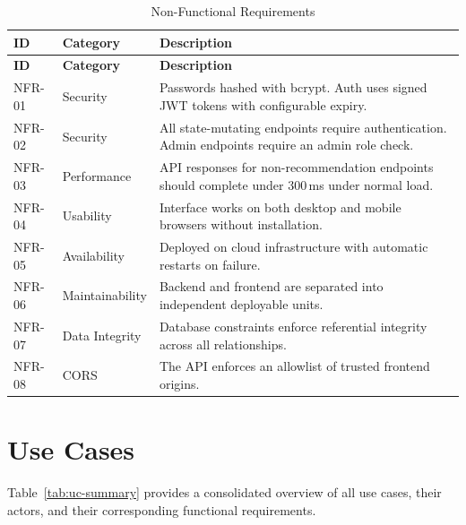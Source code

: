 \documentclass[12pt,a4paper]{report}
\begin{document}
\begin{longtable}{p{} p{} p{}}
\caption{Non-Functional Requirements}\label{tab:nonfunc-req}\\
\toprule
\textbf{ID} & \textbf{Category} & \textbf{Description} \\
\midrule
\endfirsthead
\toprule
\textbf{ID} & \textbf{Category} & \textbf{Description} \\
\midrule
\endhead
NFR-01 & Security & Passwords hashed with bcrypt. Auth uses signed JWT tokens with configurable expiry. \\
NFR-02 & Security & All state-mutating endpoints require authentication. Admin endpoints require an admin role check. \\
NFR-03 & Performance & API responses for non-recommendation endpoints should complete under 300\,ms under normal load. \\
NFR-04 & Usability & Interface works on both desktop and mobile browsers without installation. \\
NFR-05 & Availability & Deployed on cloud infrastructure with automatic restarts on failure. \\
NFR-06 & Maintainability & Backend and frontend are separated into independent deployable units. \\
NFR-07 & Data Integrity & Database constraints enforce referential integrity across all relationships. \\
NFR-08 & CORS & The API enforces an allowlist of trusted frontend origins. \\
\bottomrule
\end{longtable}

\section{Use Cases}
\label{sec:usecases}

Table~\ref{tab:uc-summary} provides a consolidated overview of all use cases, their actors, and their corresponding functional requirements.
\end{document}
